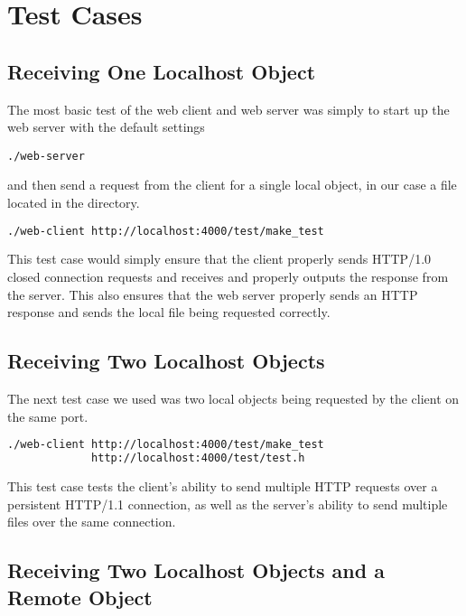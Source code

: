 \documentclass{article}
\begin{document}
\section{Test Cases}

\subsection{Receiving One Localhost Object}

The most basic test of the web client and web server was simply to start up the web server with the default settings

\begin{lstlisting}
./web-server
\end{lstlisting}

\noindent
and then send a request from the client for a single local object, in our case a file located in the  directory.

\begin{lstlisting}[language=bash]
./web-client http://localhost:4000/test/make_test
\end{lstlisting}

\noindent
This test case would simply ensure that the client properly sends HTTP/1.0 closed connection requests and receives and properly outputs the response from the server. This also ensures that the web server properly sends an HTTP response and sends the local file being requested correctly. 

\subsection{Receiving Two Localhost Objects}

The next test case we used was two local objects being requested by the client on the same port.

\begin{lstlisting}[language=bash]
./web-client http://localhost:4000/test/make_test 
             http://localhost:4000/test/test.h
\end{lstlisting}

\noindent
This test case tests the client's ability to send multiple HTTP requests over a persistent HTTP/1.1 connection, as well as the server's ability to send multiple files over the same connection.

\subsection{Receiving Two Localhost Objects and a Remote Object}
\end{document}
